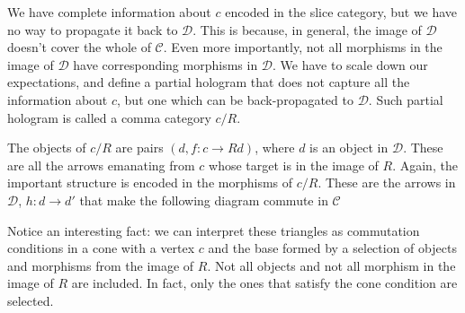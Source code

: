 \documentclass[11pt]{amsart}
\newcommand{\cat}[1]{\mathcal{#1}}
\begin{document}
We have complete information about $c$ encoded in the slice category, but we have no way to propagate it back to $\cat D$. This is because, in general, the image of $\cat D$ doesn't cover the whole of $\cat C$. Even more importantly, not all morphisms in the image of $\cat D$ have corresponding morphisms in $\cat D$. We have to scale down our expectations, and define a partial hologram that does not capture all the information about $c$, but one which can be back-propagated to $\cat D$. Such partial hologram is called a comma category $c/R$.

The objects of $c/R$ are pairs $(d, f \colon c \to R d)$, where $d$ is an object in $\cat D$. These are all the arrows emanating from $c$ whose target is in the image of $R$. Again, the important structure is encoded in the morphisms of $c/R$. These are the arrows in $\cat D$, $h \colon d \to d'$ that make the following diagram commute in $\cat C$

\begin{figure}[H]
\centering
\end{figure}
Notice an interesting fact: we can interpret these triangles as commutation conditions in a cone with a vertex $c$ and the base formed by a selection of objects and morphisms from the image of $R$. Not all objects and not all morphism in the image of $R$ are included. In fact, only the ones that satisfy the cone condition are selected. 

\begin{figure}[H]
\end{figure}
\end{document}
